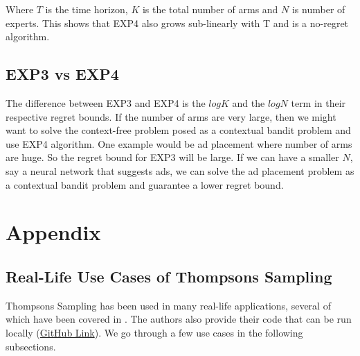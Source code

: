 \documentclass[11pt]{article}
\begin{document}
Where $T$ is the time horizon, $K$ is the total number of arms and $N$ is number of experts. This shows that EXP4 also grows sub-linearly with T and is a no-regret algorithm. 

\subsection{EXP3 vs EXP4}

The difference between EXP3 and EXP4 is the $logK$ and the $logN$ term in their respective regret bounds. If the number of arms are very large, then we might want to solve the context-free problem posed as a contextual bandit problem and use EXP4 algorithm. 
One example would be ad placement where number of arms are huge. So the regret bound for EXP3 will be large. If we can have a smaller $N$, say a neural network that suggests ads, we can solve the ad placement problem as a contextual bandit problem and guarantee a lower regret bound.






{


}




\newpage
\section{Appendix}
\subsection{Real-Life Use Cases of Thompsons Sampling}
Thompsons Sampling has been used in many real-life applications, several of which have been covered in \cite{russo2018tutorial}. The authors also provide their code that can be run locally (\href{https://github.com/iosband/ts_tutorial}{GitHub Link}). We go through a few use cases in the following subsections.
\end{document}
